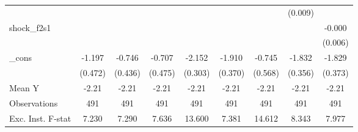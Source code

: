 {\begin{tabular}{l*{8}{c}}
            &                     &                     &                     &                     &                     &                     &     (0.009)         &                     \\
\addlinespace
shock\_f2s1  &                     &                     &                     &                     &                     &                     &                     &      -0.000         \\
            &                     &                     &                     &                     &                     &                     &                     &     (0.006)         \\
\addlinespace
\_cons      &      -1.197\sym{**} &      -0.746\sym{*}  &      -0.707         &      -2.152\sym{***}&      -1.910\sym{***}&      -0.745         &      -1.832\sym{***}&      -1.829\sym{***}\\
            &     (0.472)         &     (0.436)         &     (0.475)         &     (0.303)         &     (0.370)         &     (0.568)         &     (0.356)         &     (0.373)         \\
\midrule
Mean Y      &       -2.21         &       -2.21         &       -2.21         &       -2.21         &       -2.21         &       -2.21         &       -2.21         &       -2.21         \\
Observations&         491         &         491         &         491         &         491         &         491         &         491         &         491         &         491         \\
Exc. Inst. F-stat&       7.230         &       7.290         &       7.636         &      13.600         &       7.381         &      14.612         &       8.343         &       7.977         \\
\bottomrule
\end{tabular}
}
